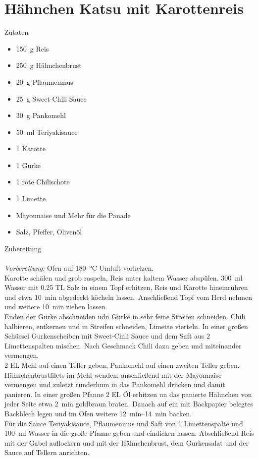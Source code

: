 \section*{Hähnchen Katsu mit Karottenreis}
\ihead{}\ohead{}
\cfoot{}
{\Large Zutaten}
\begin{multicols}{2}
\begin{itemize}
    \item \SI{150}{g} Reis
    \item \SI{250}{g} Hähnchenbrust
    \item \SI{20}{g} Pflaumenmus
    \item \SI{25}{g} Sweet-Chili Sauce
    \item \SI{30}{g} Pankomehl 
    \item \SI{50}{ml} Teriyakisauce
    \item \num{1} Karotte
    \item \num{1} Gurke
    \item \num{1} rote Chilischote
    \item \num{1} Limette
    \item Mayonnaise und Mehr für die Panade
    \item Salz, Pfeffer, Olivenöl
\end{itemize}
\end{multicols}
\noindent
{\Large Zubereitung}\\
\\
\textit{Vorbereitung:} Ofen auf \SI{180}{\celsius} Umluft vorheizen.\\
Karotte schälen und grob raspeln, Reis unter kaltem Wasser abspülen.
\SI{300}{ml} Wasser mit \num{0,25} TL Salz in einem Topf erhitzen, Reis und Karotte hineinrühren und etwa \SI{10}{min} abgedeckt köcheln lassen.
Anschließend Topf vom Herd nehmen und weitere \SI{10}{min} ziehen lassen.\\
Enden der Gurke abschneiden udn Gurke in sehr feine Streifen schneiden.
Chili halbieren, entkernen und in Streifen schneiden, Limette vierteln.
In einer großen Schüssel Gurkenscheiben mit Sweet-Chili Sauce und dem Saft aus 2 Limettenspalten mischen. 
Nach Geschmack Chili dazu geben und miteinander vermengen.\\
\num{2} EL Mehl auf einen Teller geben, Pankomehl auf einen zweiten Teller geben.
Hähnchenbrustfilets im Mehl wenden, anschließend mit der Mayonnaise vermengen und zuletzt runderhum in das Pankomehl drücken und damit panieren.
In einer großen Pfanne \num{2} EL Öl erhitzen un das panierte Hähnchen von jeder Seite etwa \SI{2}{min} goldbraun braten.
Danach auf ein mit Backpapier belegtes Backblech legen und im Ofen weitere \SIrange{12}{14}{min} backen.\\
Für die Sauce Teriyakisauce, Pflaumenmus und Saft von \num{1} Limettenspalte und \SI{100}{ml} Wasser in die große Pfanne geben und eindicken lassen. 
Abschließend Reis mit der Gabel auflockern und mit der Hähnchenbrust, dem Gurkensalat und der Sauce auf Tellern anrichten.



